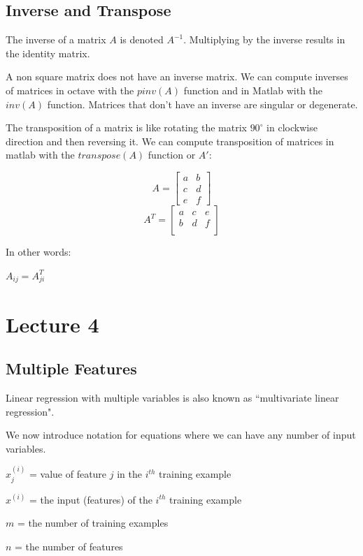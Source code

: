 \documentclass[UTF8]{article}
\begin{document}
\subsection{Inverse and Transpose}

The inverse of a matrix $A$ is denoted $A^{-1}$. Multiplying by the inverse results in the identity matrix.

A non square matrix does not have an inverse matrix. We can compute inverses of matrices in octave with the $pinv(A)$ function and in Matlab with the $inv(A)$ function. Matrices that don't have an inverse are singular or degenerate.

The transposition of a matrix is like rotating the matrix $90^{\circ}$ in clockwise direction and then reversing it. We can compute transposition of matrices in matlab with the $transpose(A)$ function or $A'$:

\[ A = \begin{bmatrix} a & b \\ c & d \\ e & f \end{bmatrix} \]
\[ A^T = \begin{bmatrix} a & c & e \\ b & d & f \\ \end{bmatrix} \]

In other words:

$A_{ij}=A^T_{ji}$

\newpage

\section{Lecture 4}

\subsection{Multiple Features}

Linear regression with multiple variables is also known as ``multivariate linear regression".

We now introduce notation for equations where we can have any number of input variables.

$x_j^{(i)}$ = value of feature $j$ in the $i^{th}$ training example

$x^{(i)}$ = the input (features) of the $i^{th}$ training example

$m$ = the number of training examples

$n$ = the number of features
\end{document}
